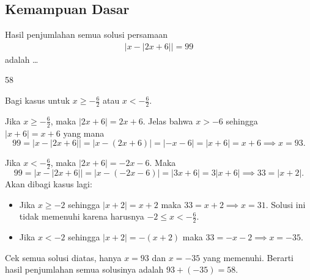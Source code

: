 \documentclass[12pt]{scrartcl}
\begin{document}
\subsection{Kemampuan Dasar}
\begin{soalbaru}
Hasil penjumlahan semua solusi persamaan
\begin{align*}
|x-|2x+6||=99
\end{align*}
adalah \dots
\end{soalbaru}
\begin{jawaban}
58
\end{jawaban}
\begin{solusi}
Bagi kasus untuk $x \ge -\tfrac{6}{2}$ atau $x < -\tfrac{6}{2}$.

Jika $x \ge -\tfrac{6}{2}$, maka $|2x+6| = 2x+6$. Jelas bahwa $x > -6$ sehingga $|x+6|=x+6$ yang mana
$$99=|x-|2x+6||=|x-(2x+6)|=|-x-6|=|x+6|=x+6 \implies x = 93.$$

Jika $x < -\tfrac{6}{2}$, maka $|2x+6| = -2x-6$. Maka
$$99=|x-|2x+6||=|x-(-2x-6)|=|3x+6|=3|x+6| \implies 33=|x+2|.$$
Akan dibagi kasus lagi:
\begin{itemize}
\item Jika $x \ge -2$ sehingga $|x+2|=x+2$ maka $33=x+2 \implies x=31$. Solusi ini tidak memenuhi karena harusnya $-2 \le x < -\tfrac{6}{2}$.
\item Jika $x < -2$ sehingga $|x+2|=-(x+2)$ maka $33=-x-2 \implies x=-35$.
\end{itemize}
Cek semua solusi diatas, hanya $x=93$ dan $x=-35$ yang memenuhi. Berarti hasil penjumlahan semua solusinya adalah $93+(-35)=\boxed{58}$.

\end{solusi}
\end{document}
